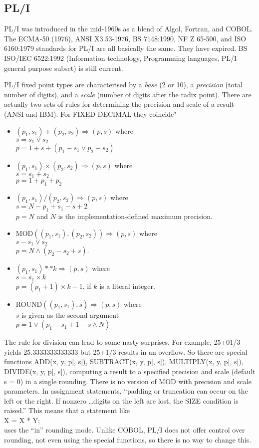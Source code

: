 \documentclass{article}
\begin{document}
\subsection{PL/I}

PL/I was introduced in the mid-1960s as a blend of Algol,
Fortran, and COBOL.  The ECMA-50 (1976), ANSI X3.53-1976, BS 7148:1990,
NF Z 65-500, and ISO 6160:1979 standards for PL/I are all basically the
same.  They have expired.  BS ISO/IEC 6522:1992 (Information technology,
Programming languages, PL/I general purpose subset) is still current.

PL/I fixed point types are characterised by a {\it base} (2 or 10),
a {\it precision} (total number of digits), and a {\it scale} (number
of digits after the radix point).  There are actually two sets of
rules for determining the precision and scale of a result (ANSI and
IBM).  For FIXED DECIMAL they coincide"
\begin{itemize}
\item
$(p_1,s_1) \pm (p_2,s_2) \Rightarrow (p,s)$ where\\
$s = s_1 \vee s_2$\\
$p = 1+s+(p_1-s_1 \vee p_2-s_2)$
\item
$(p_1,s_1) \times (p_2,s_2) \Rightarrow (p,s)$ where\\
$s = s_1 + s_2$\\
$p = 1+p_1+p_2$
\item
$(p_1,s_1) / (p_2,s_2) \Rightarrow (p,s)$ where\\
$s = N-p_1+s_1-s+2$\\
$p = N$ and $N$ is the implementation-defined maximum precision.
\item
MOD$((p_1,s_1), (p_2,s_2)) \Rightarrow (p,s)$ where\\
$s - s_1 \vee s_2$\\
$p = N \wedge (p_2 - s_2 + s)$.
\item
$(p_1,s_1) ** k \Rightarrow (p,s)$ where\\
$s = s_1\times k$\\
$p = (p_1 + 1) \times k - 1$, if $k$ is a literal integer.
\item
ROUND$((p_1,s_1), s) \Rightarrow (p,s)$ where\\
$s$ is given as the second argument\\
$p = 1 \vee (p_1-s_1+1-s \wedge N)$
\end{itemize}
The rule for division can lead to some nasty surprises.
For example, 25+01/3 yields 25.3333333333333 but
25+1/3 results in an overflow.  So there are special functions
ADD(x, y, p[, s]), SUBTRACT(x, y, p[, s]),  MULTIPLY(x, y, p[, s]),
DIVIDE(x, y, p[, s]), 
computing a result to a specified precision and scale (default s = 0)
in a single rounding.  There is no version of MOD with precision and
scale parameters.  In assignment
statements, ``padding or truncation can occur on the left or the right.
If nonzero \dots digits on the left are lost, the SIZE condition is
raised.''  This means that a statement like\\
X = X * Y;\\
uses the ``in'' rounding mode.  Unlike COBOL, PL/I does not offer
control over rounding, not even using the special functions, so there is
no way to change this.
\end{document}
